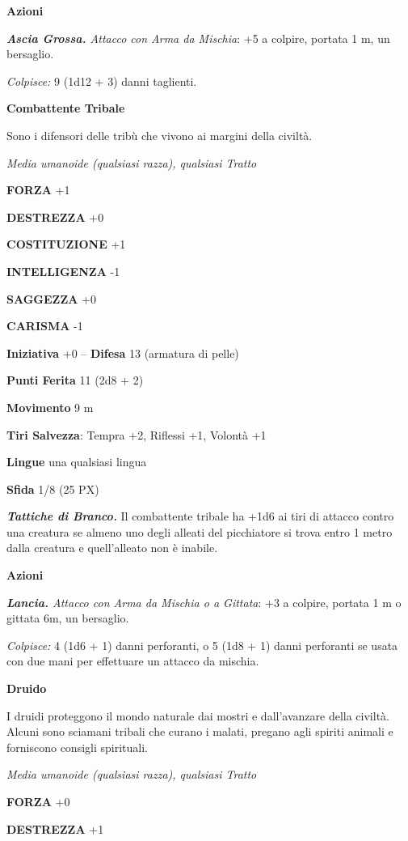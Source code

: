 \begin{multicols}{2}
\textbf{Azioni}

\textit{\textbf{Ascia Grossa.} Attacco con Arma da Mischia}: +5 a colpire, portata 1 m, un bersaglio.

\textit{Colpisce:} 9 (1d12 + 3) danni taglienti.

\textbf{Combattente Tribale}

Sono i difensori delle tribù che vivono ai margini della civiltà.

\textit{Media umanoide (qualsiasi razza), qualsiasi Tratto}

\textbf{FORZA} +1

\textbf{DESTREZZA} +0

\textbf{COSTITUZIONE} +1

\textbf{INTELLIGENZA} -1

\textbf{SAGGEZZA} +0

\textbf{CARISMA} -1

\textbf{Iniziativa} +0 -- \textbf{Difesa} 13 (armatura di pelle)

\textbf{Punti Ferita} 11 (2d8 + 2)

\textbf{Movimento} 9 m

\textbf{Tiri Salvezza}: Tempra +2, Riflessi +1, Volontà +1

\textbf{Lingue} una qualsiasi lingua

\textbf{Sfida} 1/8 (25 PX)

\textit{\textbf{Tattiche di Branco.}} Il combattente tribale ha +1d6 ai tiri di attacco contro una creatura se almeno uno degli alleati del picchiatore si trova entro 1 metro dalla creatura e quell'alleato non è inabile.

\textbf{Azioni}

\textit{\textbf{Lancia.} Attacco con Arma da Mischia o a Gittata}: +3 a colpire, portata 1 m o gittata 6m, un bersaglio.

\textit{Colpisce:} 4 (1d6 + 1) danni perforanti, o 5 (1d8 + 1) danni perforanti se usata con due mani per effettuare un attacco da mischia.

\medskip\textbf{Druido}

I druidi proteggono il mondo naturale dai mostri e dall'avanzare della civiltà. Alcuni sono sciamani tribali che curano i malati, pregano agli spiriti animali e forniscono consigli spirituali.

\textit{Media umanoide (qualsiasi razza), qualsiasi Tratto}

\textbf{FORZA} +0

\textbf{DESTREZZA} +1


\end{multicols}
